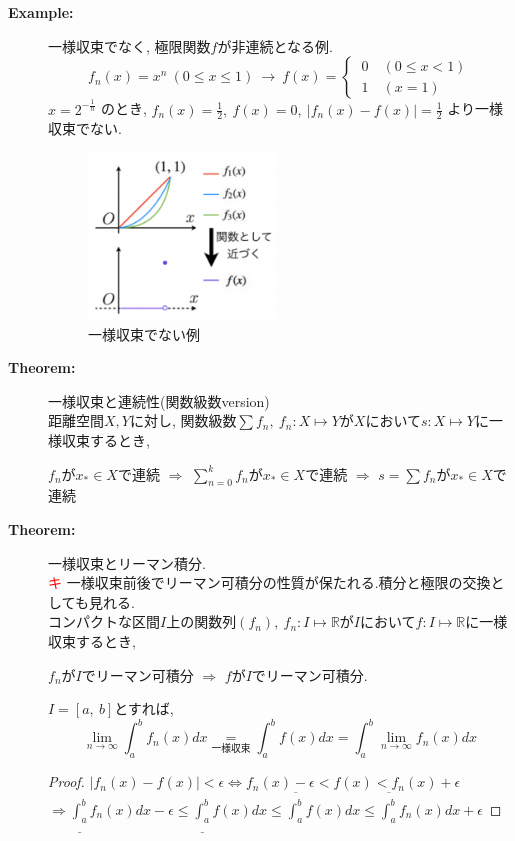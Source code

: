 \documentclass[dvipdfmx]{jsarticle}
\newcommand{\point}{\textcircled{\textcolor{red}{\scriptsize キ}} }
\begin{document}
\begin{description}
    \item[\bf{Example:}] 一様収束でなく, 極限関数$f$が非連続となる例. \\
        $$f_n(x) = x^n \ (0 \leq x \leq 1) \ \rightarrow \ f(x) = \begin{cases} \ 0 \quad (0 \leq x < 1) \\ \ 1 \quad ( x = 1) \end{cases}$$
        $x = 2^{-\frac{1}{n}}$ のとき, $f_n(x) = \frac{1}{2},\ f(x) = 0,\ |f_n(x) - f(x)| = \frac{1}{2}$ より一様収束でない.
    \begin{figure}[H]
        \begin{center}
        \includegraphics[clip,width=5cm]{./not_uni_conv.png}
        \caption{一様収束でない例}
        \end{center}
    \end{figure}

    \item[\bf{Theorem:}] 一様収束と連続性(関数級数version) \\
        距離空間$X, Y$に対し, 関数級数$\sum f_n,\ f_n : X \mapsto Y$が$X$において$s : X \mapsto Y$に一様収束するとき, 
        \begin{center}
        $f_n$が$x_* \in X$で連続 $\Rightarrow$ $\sum_{n=0}^k f_n$が$x_* \in X$で連続 $\Rightarrow$ $s = \sum f_n$が$x_* \in X$で連続 \end{center}
    
    \item[\bf{Theorem:}] 一様収束とリーマン積分. \\
        \point 一様収束前後でリーマン可積分の性質が保たれる.積分と極限の交換としても見れる. \\
        コンパクトな区間$I$上の関数列$(f_n),\ f_n : I \mapsto \mathbb{R}$が$I$において$f : I \mapsto \mathbb{R}$に一様収束するとき, 
        \begin{center} $f_n$が$I$でリーマン可積分 $\Rightarrow$ $f$が$I$でリーマン可積分. \end{center}
        $I=[a,\ b]$とすれば, 
        $$ \lim_{n \to \infty} \int_a^b f_n(x) dx \underset{一様収束}{=} \int_a^b f(x) dx = \int_a^b \lim_{n \to \infty} f_n(x) dx$$
        \begin{proof}
            $ | f_n(x) - f(x) | < \epsilon \Leftrightarrow f_n(x) - \epsilon < f(x) < f_n(x) + \epsilon$ \\ 
            $ \displaystyle \Rightarrow \underline{ \int_a^b} f_n(x) dx - \epsilon \leq \underline{ \int_a^b} f(x) dx  \leq \overline{ \int_a^b } f(x) dx  \leq \overline{ \int_a^b } f_n(x) dx + \epsilon $
        \end{proof} \\


\end{description}
\end{document}
